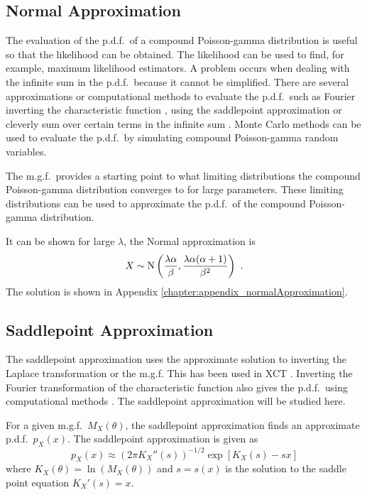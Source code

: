 \subsection{Normal Approximation}

The evaluation of the p.d.f.~of a compound Poisson-gamma distribution is useful so that the likelihood can be obtained. The likelihood can be used to find, for example, maximum likelihood estimators. A problem occurs when dealing with the infinite sum in the p.d.f.~because it cannot be simplified. There are several approximations or computational methods to evaluate the p.d.f.~such as Fourier inverting the characteristic function \citep{dunn2008evaluation}, using the saddlepoint approximation \citep{daniels1954saddlepoint} or cleverly sum over certain terms in the infinite sum \citep{dunn2005series}. Monte Carlo methods can be used to evaluate the p.d.f.~by simulating compound Poisson-gamma random variables.

The m.g.f.~provides a starting point to what limiting distributions the compound Poisson-gamma distribution converges to for large parameters. These limiting distributions can be used to approximate the p.d.f.~of the compound Poisson-gamma distribution.

It can be shown for large $\lambda$, the Normal approximation \citep{shevtsova2014on} is
\begin{equation}
  X\sim\operatorname{N}\left(\frac{\lambda\alpha}{\beta},\frac{\lambda\alpha(\alpha+1)}{\beta^2}\right) \ .
\end{equation}
The solution is shown in Appendix \ref{chapter:appendix_normalApproximation}.

\subsection{Saddlepoint Approximation}

The saddlepoint approximation \citep{daniels1954saddlepoint} uses the approximate solution to inverting the Laplace transformation or the m.g.f. This has been used in XCT \citep{elbakri2003statistical, elbakri2003efficient}. Inverting the Fourier transformation of the characteristic function also gives the p.d.f.~using computational methods \citep{dunn2008evaluation}. The saddlepoint approximation will be studied here.

For a given m.g.f.~$M_X(\theta)$, the saddlepoint approximation \citep{daniels1954saddlepoint, butler2007saddlepoint} finds an approximate p.d.f.~$p_X(x)$. The saddlepoint approximation is given as
\begin{equation}
  p_X(x)\approx\left(2\pi K_X''(s)\right)^{-1/2}\exp\left[K_X(s)-sx\right]
  \label{eq:saddlePoint:generalSaddlePoint}
\end{equation}
where $K_X(\theta) = \ln\left(M_X(\theta)\right)$ and $s=s(x)$ is the solution to the saddle point equation $K_X'(s)=x$.

